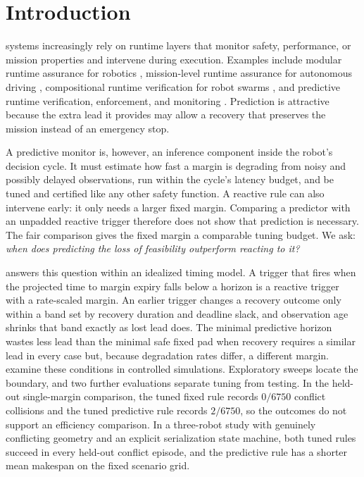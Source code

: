 \section{Introduction}
\label{sec:introduction}

 systems increasingly rely on runtime layers that
monitor safety, performance, or mission properties and intervene during
execution.  Examples include modular runtime assurance for robotics
\cite{desai2019soter}, mission-level runtime assurance for autonomous driving
\cite{tsai2026missionrta}, compositional runtime verification for robot swarms
\cite{kekatos2026swarmrta}, and predictive runtime verification, enforcement,
and monitoring
\cite{pinisetty2017prv,pinisetty2017pre,yoon2019prm,wheatman2021radics}.
Prediction is attractive because the extra lead it provides may allow a recovery
that preserves the mission instead of an emergency stop.

A predictive monitor is, however, an inference component inside the robot's
decision cycle.  It must estimate how fast a margin is degrading from noisy and
possibly delayed observations, run within the cycle's latency budget, and be
tuned and certified like any other safety function.  A reactive rule can also
intervene early: it only needs a larger fixed margin.  Comparing a predictor
with an unpadded reactive trigger therefore does not show that prediction is
necessary.  The fair comparison gives the fixed margin a comparable tuning
budget.  We ask: \emph{when does predicting the loss of feasibility outperform
reacting to it?}

 answers this question within an idealized timing model.  A
trigger that fires when the projected time to margin expiry falls below a
horizon is a reactive trigger with a rate-scaled margin.  An earlier trigger
changes a recovery outcome only within a band set by recovery duration and
deadline slack, and observation age shrinks that band exactly as lost lead does.
The minimal predictive horizon wastes less lead than the minimal safe fixed pad
when recovery requires a similar lead in every case but, because degradation
rates differ, a different margin.   examine these
conditions in controlled simulations.  Exploratory sweeps locate the boundary,
and two further evaluations separate tuning from testing.  In the held-out
single-margin comparison, the tuned fixed rule records $0/6750$ conflict
collisions and the tuned predictive rule records $2/6750$, so the outcomes do not
support an efficiency comparison.  In a three-robot study with genuinely
conflicting geometry and an explicit serialization state machine, both tuned
rules succeed in every held-out conflict episode, and the predictive rule has a
shorter mean makespan on the fixed scenario grid.

